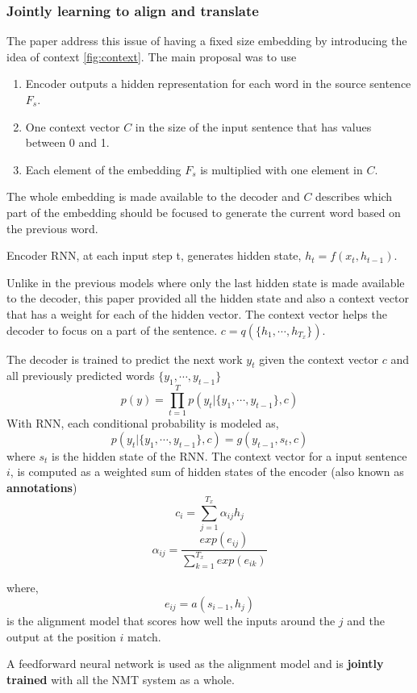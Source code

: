 \documentclass[conference]{IEEEtran}
\begin{document}
\subsubsection{Jointly learning to align and translate} \label{sec:JT}
The paper \cite{bahdanau2014neural} address this issue of having a fixed size embedding by introducing the idea of context \ref{fig:context}. The main proposal was to use
\begin{enumerate}
 \item Encoder outputs a hidden representation for each word in the source sentence $F_s$.
 \item One context vector $C$ in the size of the input sentence that has values between 0 and 1.
 \item Each element of the embedding $F_s$ is multiplied with one element in $C$.
\end{enumerate}
The whole embedding is made available to the decoder and $C$ describes which part of the embedding should be focused to generate the current word based on the previous word.

Encoder RNN, at each input step t, generates hidden state, $h_t = f(x_t, h_{t-1})$.

Unlike in the previous models where only the last hidden state is made available to the decoder, this paper provided all the hidden state and also a context vector that has a weight for each of the hidden vector. The context vector helps the decoder to focus on a part of the sentence. $c = q(\{h_1,\cdots,h_{T_x}\})$. 

The decoder is trained to predict the next work $y_t$ given the context vector $c$ and all previously predicted words $\{ y_1, \cdots, y_{t-1}\}$
 $$ p(y) = \prod^{T}_{t=1} p(y_t | \{ y_1, \cdots, y_{t-1}\} ,c ) $$
 With RNN, each conditional probability is modeled as,
 $$ p(y_t | \{ y_1, \cdots, y_{t-1}\}, c) = g(y_{t-1}, s_t, c) $$ where $s_t$ is the hidden state of the RNN.
 The context vector for a input sentence $i$, is computed as a weighted sum of hidden states of the encoder (also known as \textbf{annotations})
  $$ c_i = \sum_{j=1}^{T_{x}} \alpha_{ij} h_j$$
  $$ \alpha_{ij} = \frac{ exp(e_{ij})}{ \sum_{k=1}^{T_x} exp (e_{ik})}$$

where,
$$ e_{ij} = a(s_{i-1}, h_j)  $$ is the alignment model that scores how well the inputs around the $j$ and the output at the position $i$ match.

A feedforward neural network is used as the alignment model and is \textbf{jointly trained} with all the NMT system as a whole.
\end{document}
